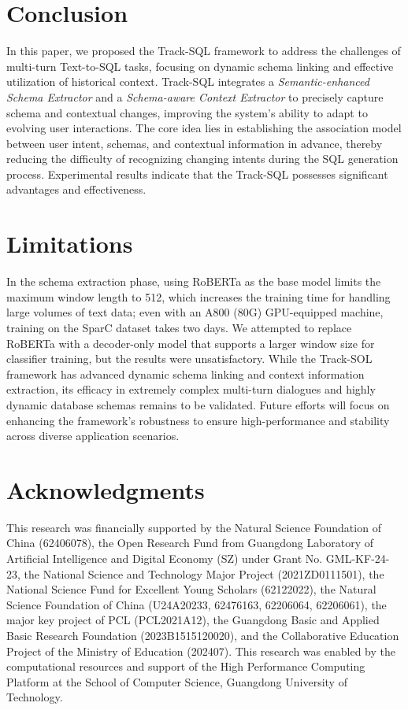 \documentclass[11pt]{article}
\begin{document}
\section{Conclusion}
\label{sec:bibtex}
In this paper, we proposed the Track-SQL framework to address the challenges of multi-turn Text-to-SQL tasks, focusing on dynamic schema linking and effective utilization of historical context. Track-SQL integrates a \emph{Semantic-enhanced Schema Extractor} and a \emph{Schema-aware Context Extractor} to precisely capture schema and contextual changes, improving the system’s ability to adapt to evolving user interactions. The core idea lies in establishing the association model between user intent, schemas, and contextual information in advance, thereby reducing the difficulty of recognizing changing intents during the SQL generation process. Experimental results indicate that the Track-SQL possesses significant advantages and effectiveness.

\section*{Limitations}
In the schema extraction phase, using RoBERTa as the base model limits the maximum window length to 512, which increases the training time for handling large volumes of text data; even with an A800 (80G) GPU-equipped machine, training on the SparC dataset takes two days. We attempted to replace RoBERTa with a decoder-only model that supports a larger window size for classifier training, but the results were unsatisfactory. While the Track-SOL framework has advanced dynamic schema linking and context information extraction, its efficacy in extremely complex multi-turn dialogues and highly dynamic database schemas remains to be validated. Future efforts will focus on enhancing the framework's robustness to ensure high-performance and stability across diverse application scenarios.

\section*{Acknowledgments}
This research was financially supported by the Natural Science Foundation of China (62406078), the Open Research Fund from Guangdong Laboratory of Artificial Intelligence and Digital Economy (SZ) under Grant No. GML-KF-24-23, the National Science and Technology Major Project (2021ZD0111501), the National Science Fund for Excellent Young Scholars (62122022), the Natural Science Foundation of China (U24A20233, 62476163, 62206064, 62206061), the major key project of PCL (PCL2021A12), the Guangdong Basic and Applied Basic Research Foundation (2023B1515120020), and the Collaborative Education Project of the Ministry of Education (202407). This research was enabled by the computational resources and support of the High Performance Computing Platform at the School of Computer Science, Guangdong University of Technology.
\end{document}
